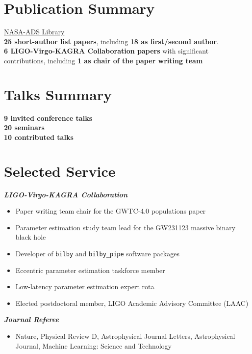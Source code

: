             \section{Publication Summary}
            \href{https://ui.adsabs.harvard.edu/public-libraries/LqJDfKCTTdeuL_Inb7SwVw}{NASA-ADS Library}\\
            \textbf{25 short-author list papers}, including \textbf{18 as first/second author}.\\
            \textbf{6 LIGO-Virgo-KAGRA Collaboration papers} with significant contributions, including \textbf{1 as chair of the paper writing team}

            \section{Talks Summary}
            \textbf{9 invited conference talks}\\
            \textbf{20 seminars}\\
            \textbf{10 contributed talks}

			\section{Selected Service}
			\textit{\textbf{LIGO-Virgo-KAGRA Collaboration}}
			\begin{itemize}
            \item{Paper writing team chair for the GWTC-4.0 populations paper}
            \item{Parameter estimation study team lead for the GW231123 massive binary black hole}
            \item{Developer of \texttt{bilby} and \texttt{bilby\_pipe} software packages}
			\item{Eccentric parameter estimation taskforce member}
			\item{Low-latency parameter estimation expert rota}
			\item{Elected postdoctoral member, LIGO Academic Advisory Committee (LAAC)}
        	\end{itemize}
        	\textit{\textbf{Journal Referee}}
        	\begin{itemize}
        		\item Nature, Physical Review D, Astrophysical Journal Letters, Astrophysical Journal, Machine Learning: Science and Technology
        	\end{itemize}


